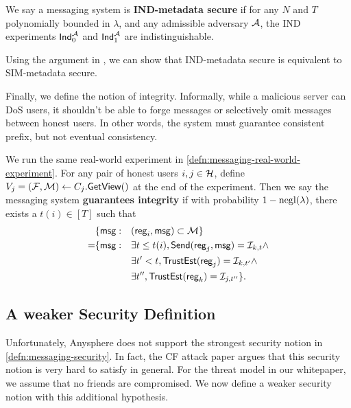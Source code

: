 \begin{definition}
\label{defn:messaging-IND-security}
We say a messaging system is \textbf{IND-metadata secure} if for any $N$ and $T$ polynomially bounded in $\lambda$, and any admissible adversary $\mathcal{A}$, the IND experiments $\mathsf{Ind}_0^{\mathcal{A}}$ and $\mathsf{Ind}_1^{\mathcal{A}}$ are indistinguishable.
\end{definition}

Using the argument in \cite{shi2021non}, we can show that IND-metadata secure is equivalent to SIM-metadata secure.

Finally, we define the notion of integrity. Informally, while a malicious server can DoS users, it shouldn't be able to forge messages  or selectively omit messages between honest users. In other words, the system must guarantee consistent prefix, but not eventual consistency.
\begin{definition}
\label{defn:messaging-integrity}
We run the same real-world experiment in \cref{defn:messaging-real-world-experiment}. For any pair of honest users $i, j \in \mathcal{H}$, define $V_j = (\mathcal{F}, \mathcal{M}) \leftarrow C_j.\mathsf{GetView}()$ at the end of the experiment. Then we say the messaging system \textbf{guarantees integrity} if with probability $1 - \operatorname{negl}(\lambda)$, there exists a $t(i) \in [T]$ such that
\begin{align*}
     &\{\mathsf{msg}: &&(\mathsf{reg}_i, \mathsf{msg}) \subset \mathcal{M}\} \\
      =& \{\mathsf{msg}: &&\exists t \leq t(i), \mathsf{Send}(\mathsf{reg}_j, \mathsf{msg}) = \mathcal{I}_{k, t} \land \\
          &   &&\exists t' < t, \mathsf{TrustEst}(\mathsf{reg}_j) = \mathcal{I}_{k, t'} \land \\
          &   &&\exists t'', \mathsf{TrustEst}(\mathsf{reg}_k) = \mathcal{I}_{j, t''}\}.
\end{align*}
\end{definition}

\subsection{A weaker Security Definition}
\label{subsec:messaging-security-weaker}
Unfortunately, Anysphere does not support the strongest security notion in \cref{defn:messaging-security}. In fact, the CF attack paper \cite{angel2018s} argues that this security notion is very hard to satisfy in general. For the threat model in our whitepaper, we assume that no friends are compromised. We now define a weaker security notion with this additional hypothesis.


